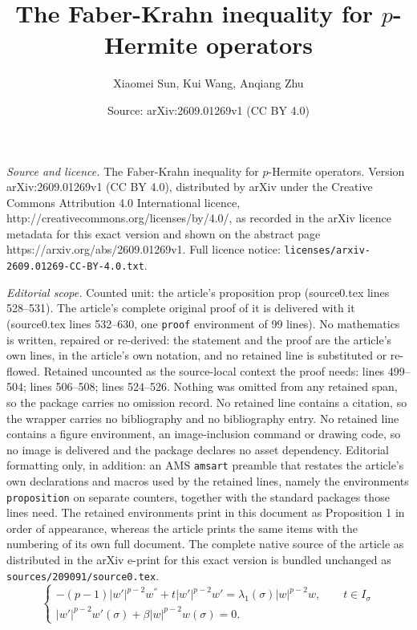\documentclass[10pt,a4paper]{amsart}
\title{The Faber-Krahn inequality for $p$-Hermite operators}
\author{Xiaomei Sun, Kui Wang, Anqiang Zhu}
\date{Source: arXiv:2609.01269v1 (CC BY 4.0)}
\begin{document}
\maketitle

\noindent\emph{Source and licence.} The Faber-Krahn inequality for $p$-Hermite operators. Version arXiv:2609.01269v1 (CC BY 4.0), distributed by arXiv under the Creative Commons Attribution 4.0 International licence, http://creativecommons.org/licenses/by/4.0/, as recorded in the arXiv licence metadata for this exact version and shown on the abstract page https://arxiv.org/abs/2609.01269v1. Full licence notice: \texttt{licenses/arxiv-2609.01269-CC-BY-4.0.txt}.\par\smallskip

\noindent\textit{Editorial scope.} Counted unit: the article's proposition prop (source0.tex lines 528--531). The article's complete original proof of it is delivered with it (source0.tex lines 532--630, one \texttt{proof} environment of 99 lines). No mathematics is written, repaired or re-derived: the statement and the proof are the article's own lines, in the article's own notation, and no retained line is substituted or re-flowed.  Retained uncounted as the source-local context the proof needs: lines 499--504; lines 506--508; lines 524--526.  Nothing was omitted from any retained span, so the package carries no omission record.  No retained line contains a citation, so the wrapper carries no bibliography and no bibliography entry.  No retained line contains a figure environment, an image-inclusion command or drawing code, so no image is delivered and the package declares no asset dependency.  Editorial formatting only, in addition: an AMS \texttt{amsart} preamble that restates the article's own declarations and macros used by the retained lines, namely the environments \texttt{proposition} on separate counters, together with the standard packages those lines need.  The retained environments print in this document as Proposition 1 in order of appearance, whereas the article prints the same items with the numbering of its own full document.  The complete native source of the article as distributed in the arXiv e-print for this exact version is bundled unchanged as \texttt{sources/209091/source0.tex}.
\begin{equation}\label{3.5}
\begin{cases}
-(p-1)|w'|^{p-2}w^{''}+t|w'|^{p-2}w'=\lambda_1(\sigma)|w|^{p-2}w,\qquad t\in I_{\sigma}\\
|w'|^{p-2}w'(\sigma)+\beta|w|^{p-2}w(\sigma)=0.
\end{cases}
\end{equation}
\end{document}
